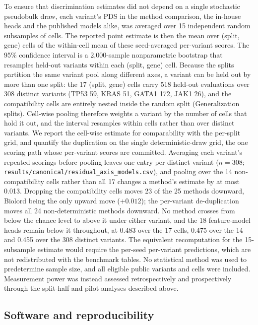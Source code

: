 \documentclass[11pt,letterpaper]{article}
\begin{document}
To ensure that discrimination estimates did not depend on a single stochastic pseudobulk draw, each variant's PDS in the method comparison, the in-house heads and the published models alike, was averaged over 15 independent random subsamples of cells. The reported point estimate is then the mean over (split, gene) cells of the within-cell mean of these seed-averaged per-variant scores. The 95\% confidence interval is a 2,000-sample nonparametric bootstrap that resamples held-out variants within each (split, gene) cell. Because the splits partition the same variant pool along different axes, a variant can be held out by more than one split: the 17 (split, gene) cells carry 518 held-out evaluations over 308 distinct variants (TP53 59, KRAS 51, GATA1 172, JAK1 26), and the compatibility cells are entirely nested inside the random split (Generalization splits). Cell-wise pooling therefore weights a variant by the number of cells that hold it out, and the interval resamples within cells rather than over distinct variants. We report the cell-wise estimate for comparability with the per-split grid, and quantify the duplication on the single deterministic-draw grid, the one scoring path whose per-variant scores are committed. Averaging each variant's repeated scorings before pooling leaves one entry per distinct variant ($n = 308$; \texttt{results/canonical/residual\_axis\_models.csv}), and pooling over the 14 non-compatibility cells rather than all 17 changes a method's estimate by at most 0.013. Dropping the compatibility cells moves 23 of the 25 methods downward, Biolord being the only upward move ($+0.012$); the per-variant de-duplication moves all 24 non-deterministic methods downward. No method crosses from below the chance level to above it under either variant, and the 18 feature-model heads remain below it throughout, at 0.483 over the 17 cells, 0.475 over the 14 and 0.455 over the 308 distinct variants. The equivalent recomputation for the 15-subsample estimate would require the per-seed per-variant predictions, which are not redistributed with the benchmark tables. No statistical method was used to predetermine sample size, and all eligible public variants and cells were included. Measurement power was instead assessed retrospectively and prospectively through the split-half and pilot analyses described above.

\subsection*{Software and reproducibility}
\end{document}
